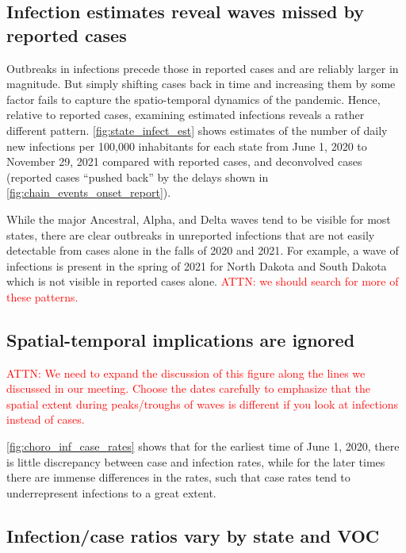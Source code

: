 \documentclass{article}
\newcommand{\attn }[1]{\textcolor{red}{ATTN: #1}}
\begin{document}
\subsection{Infection estimates reveal waves missed by reported cases}
\label{sec:omitted-waves}

Outbreaks in infections precede those in reported cases and are reliably larger
in magnitude. But simply shifting cases back in time and increasing them by some
factor fails to capture the spatio-temporal dynamics of the pandemic. 
Hence, relative to reported cases, examining estimated infections reveals a
rather different pattern. \autoref{fig:state_infect_est} shows
estimates of the number of daily new infections per 100,000 inhabitants for each
\US state from June 1, 2020 to November 29, 2021 compared with reported cases,
and deconvolved cases (reported cases ``pushed back'' by the delays shown in
\autoref{fig:chain_events_onset_report}). 

While the major Ancestral, Alpha, and Delta waves tend to be visible for most
states, there are clear outbreaks in unreported infections that are not easily
detectable from cases alone in the falls of 2020 and 2021. For example, a wave 
of infections is present in the spring of 2021 for North Dakota and South Dakota
which is not visible in reported cases alone. \attn{we should search for more of
these patterns.}

\subsection{Spatial-temporal implications are ignored}
\label{sec:ignored-patterns}

\attn{We need to expand the discussion of this figure along the lines we
discussed in our meeting. Choose the dates carefully to emphasize that the
spatial extent during peaks/troughs of waves is different if you look at
infections instead of cases.}

\autoref{fig:choro_inf_case_rates} shows that for the
earliest time of June 1, 2020, there is little discrepancy between case and
infection rates, while for the later times there are immense differences in the
rates, such that case rates tend to underrepresent infections to a great extent.



\subsection{Infection/case ratios vary by state and VOC}
\label{sec:case-infection-ratio}
\end{document}
